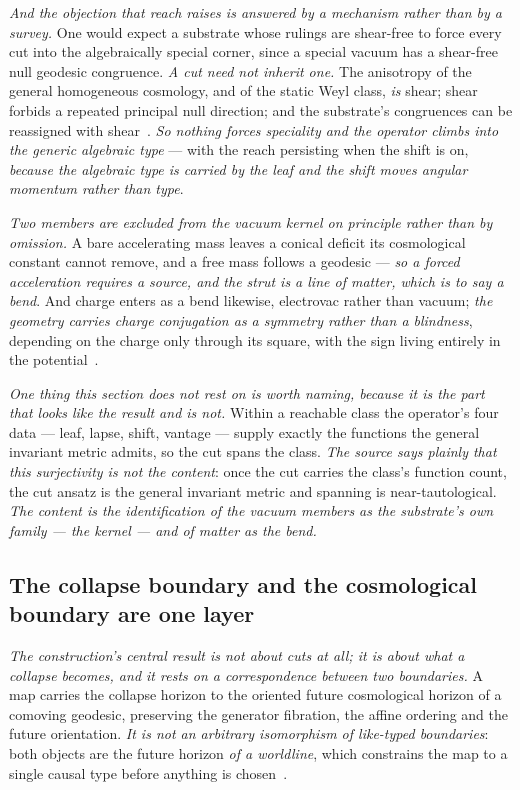 \documentclass[11pt,a4paper]{article}
\theoremstyle{plain}
\theoremstyle{definition}
\begin{document}
\emph{And the objection that reach raises is answered by a mechanism rather than by a survey.} One would
expect a substrate whose rulings are shear-free to force every cut into the algebraically special corner,
since a special vacuum has a shear-free null geodesic congruence. \emph{A cut need not inherit one.} The
anisotropy of the general homogeneous cosmology, and of the static Weyl class, \emph{is} shear; shear forbids
a repeated principal null direction; and the substrate's congruences can be reassigned with
shear~\cite{JanzenRange}. \emph{So nothing forces speciality and the operator climbs into the generic
algebraic type} --- with the reach persisting when the shift is on, \emph{because the algebraic type is
carried by the leaf and the shift moves angular momentum rather than type}.

\emph{Two members are excluded from the vacuum kernel on principle rather than by omission.} A bare
accelerating mass leaves a conical deficit its cosmological constant cannot remove, and a free mass follows a
geodesic --- \emph{so a forced acceleration requires a source, and the strut is a line of matter, which is to
say a bend}. And charge enters as a bend likewise, electrovac rather than vacuum; \emph{the geometry carries
charge conjugation as a symmetry rather than a blindness}, depending on the charge only through its square,
with the sign living entirely in the potential~\cite{JanzenRange}.

\emph{One thing this section does not rest on is worth naming, because it is the part that looks like the
result and is not.} Within a reachable class the operator's four data --- leaf, lapse, shift, vantage ---
supply exactly the functions the general invariant metric admits, so the cut spans the class. \emph{The source says
plainly that this surjectivity is not the content}: once the cut carries the class's function count, the cut
ansatz is the general invariant metric and spanning is near-tautological. \emph{The content is the
identification of the vacuum members as the substrate's own family --- the kernel --- and of matter as the
bend.}

\subsection{The collapse boundary and the cosmological boundary are one layer}

\emph{The construction's central result is not about cuts at all; it is about what a collapse becomes, and it
rests on a correspondence between two boundaries.} A map carries the collapse horizon to the oriented future
cosmological horizon of a comoving geodesic, preserving the generator fibration, the affine ordering and the
future orientation. \emph{It is not an arbitrary isomorphism of like-typed boundaries}: both objects are the
future horizon \emph{of a worldline}, which constrains the map to a single causal type before anything is
chosen~\cite{JanzenCRframework}.
\end{document}

